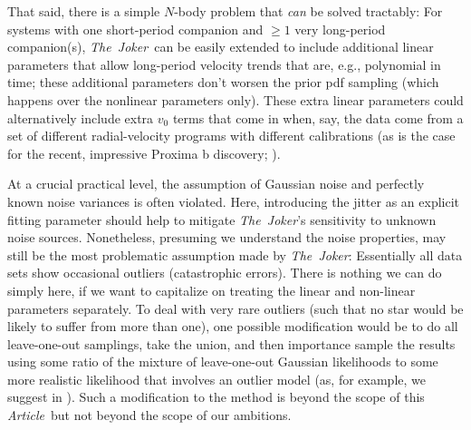 \documentclass[manuscript, letterpaper]{aastex6}
\newcommand{\project}[1]{\textsl{#1}}
\newcommand{\samplername}{\project{The~Joker}}
\newcommand{\documentname}{\textsl{Article}}
\newcommand{\sectionname}{Section}
\newcommand{\resp}[1]{#1}
\begin{document}
That said, there is a simple $N$-body problem that \emph{can} be solved
tractably:
For systems with one short-period companion and $\geq1$ very long-period
companion(s), \samplername\ can be easily extended to include additional linear
parameters that allow long-period velocity trends that are, e.g., polynomial in
time; these additional parameters don't worsen the prior pdf sampling (which
happens over the nonlinear parameters only).
These extra linear parameters could alternatively include extra $v_0$ terms that
come in when, say, the data come from a set of different radial-velocity
programs with different calibrations (as is the case for the recent, impressive
Proxima b discovery; \citealt{Anglada-Escude:2016}).



At a crucial practical level, \resp{the assumption of Gaussian noise and
perfectly known noise variances is often violated.}
\resp{Here, introducing the jitter as an explicit fitting parameter should help
to mitigate \samplername's sensitivity to unknown noise sources.}
Nonetheless, presuming we understand the noise properties, may still be the most
problematic  assumption made by
\samplername :
Essentially all data sets show occasional outliers (catastrophic errors).
There is nothing we can do simply here, if we want to capitalize on treating the
linear and non-linear parameters separately.
To deal with very rare outliers (such that no star would be likely to suffer
from more than one), one possible modification would be to do all leave-one-out
samplings, take the union, and then importance sample the results using some
ratio of the mixture of leave-one-out Gaussian likelihoods to some more
realistic likelihood that involves an outlier model (as, for example, we suggest
in \citealt{Hogg:2010a}).
Such a modification to the method is beyond the scope of this
\documentname\, but not beyond the scope of our ambitions.
\end{document}

